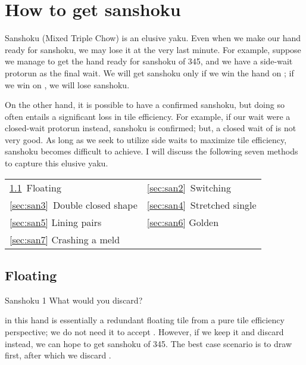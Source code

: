 \newpage
\section{How to get {\jap sanshoku}}  \label{sec:san}

{\jap Sanshoku} (Mixed Triple Chow) is an elusive {\jap yaku}.
Even when we make our hand ready for {\jap sanshoku}, we may lose it at the very last minute. For example, suppose we manage to get the hand ready for {\jap sanshoku} of 345, and we have a side-wait protorun {\LARGE{}} as the final wait. We will get {\jap sanshoku} only if we win the hand on {\LARGE{}}; if we win on {\LARGE{}}, we will lose {\jap sanshoku}.

\bigskip
On the other hand, it is possible to have a confirmed {\jap sanshoku}, but doing so often entails a significant loss in tile efficiency. For example, if our wait were a closed-wait protorun {\LARGE{}} instead, {\jap sanshoku} is confirmed; but, a closed wait of {\LARGE{}} is not very good. As long as we seek to utilize side waits to maximize tile efficiency, {\jap sanshoku} becomes difficult to achieve. I will discuss the following seven methods to capture this elusive {\jap yaku}.

\bigskip
\begin{tabular}{l l}
\ref{sec:san1}~Floating & \ref{sec:san2}~Switching\\
\ref{sec:san3}~Double closed shape & \ref{sec:san4}~Stretched single\\
\ref{sec:san5} Lining pairs &\ref{sec:san6} Golden\\
\ref{sec:san7} Crashing a meld\\
\end{tabular}

\newpage

\subsection{Floating}\label{sec:san1}

\begin{itembox}[r]{{\jap Sanshoku} 1}
\bp
{}\bei
\ep
\vspace{-10pt} What would you discard? \vspace{-5pt}
\end{itembox}
\noindent
{\LARGE{}} in this hand is essentially a redundant floating tile from a pure tile efficiency perspective; we do not need it to accept {\LARGE{}}. However, if we keep it and discard {\LARGE\bei} instead, we can hope to get {\jap sanshoku} of 345. The best case scenario is to draw {\LARGE{}} first, after which we discard {\LARGE{}}.

